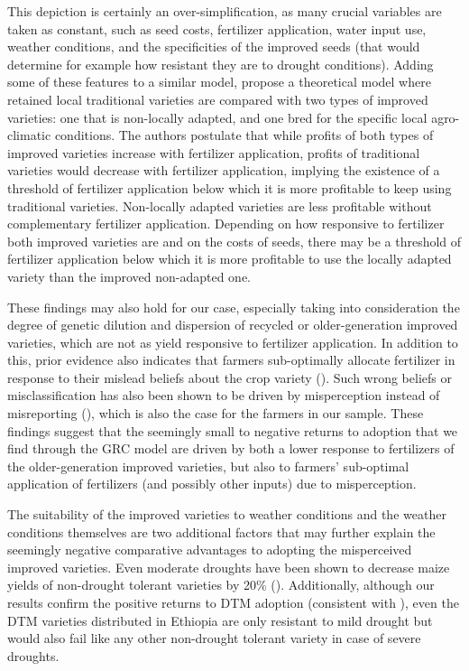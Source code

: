 \documentclass[11pt]{article}
\begin{document}
This depiction is certainly an over-simplification, as many crucial variables are taken as constant, such as seed costs, fertilizer application, water input use, weather conditions, and the specificities of the improved seeds (that would determine for example how resistant they are to drought conditions). Adding some of these features to a similar model, \cite{Bird2020-nt} propose a theoretical model where retained local traditional varieties are compared with two types of improved varieties: one that is non-locally adapted, and one bred for the specific local agro-climatic conditions. The authors postulate that while profits of both types of improved varieties increase with fertilizer application, profits of traditional varieties would decrease with fertilizer application, implying the existence of a threshold of fertilizer application below which it is more profitable to keep using traditional varieties. Non-locally adapted varieties are less profitable without complementary fertilizer application. Depending on how responsive to fertilizer both improved varieties are and on the costs of seeds, there may be a threshold of fertilizer application below which it is more profitable to use the locally adapted variety than the improved non-adapted one.

These findings may also hold for our case, especially taking into consideration the degree of genetic dilution and dispersion of recycled or older-generation improved varieties, which are not as yield responsive to fertilizer application. In addition to this, prior evidence also indicates that farmers sub-optimally allocate fertilizer in response to their mislead beliefs about the crop variety (\citealt{euler2022because}). Such wrong beliefs or misclassification has also been shown to be driven by misperception instead of misreporting (\citealt{wossen2022misperceiving}), which is also the case for the farmers in our sample. These findings suggest that the seemingly small to negative returns to adoption that we find through the GRC model are driven by both a lower response to fertilizers of the older-generation improved varieties, but also to farmers’ sub-optimal application of fertilizers (and possibly other inputs) due to misperception.

The suitability of the improved varieties to weather conditions and the weather conditions themselves are two additional factors that may further explain the seemingly negative comparative advantages to adopting the misperceived improved varieties. Even moderate droughts have been shown to decrease maize yields of non-drought tolerant varieties by 20\% (\citealt{paul2021heterogeneous}). Additionally, although our results confirm the positive returns to DTM adoption (consistent with \citealt{wossen2017measuring}), even the DTM varieties distributed in Ethiopia are only resistant to mild drought but would also fail like any other non-drought tolerant variety in case of severe droughts. 
\end{document}
